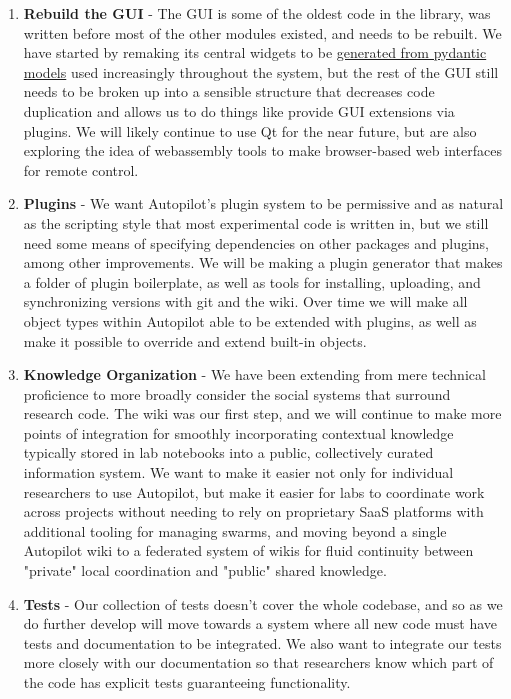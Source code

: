 \begin{enumerate}[ref=\thechapter.\arabic*]
    \item \label{future:gui} \textbf{Rebuild the GUI} - The GUI is some of the oldest code in the library, was written before most of the other modules existed, and needs to be rebuilt. We have started by remaking its central widgets to be \href{https://github.com/auto-pi-lot/autopilot/blob/f0d20fbf3b33f832cf31136ab7d16abe01a3e924/autopilot/gui/widgets/model.py}{generated from pydantic models} used increasingly throughout the system, but the rest of the GUI still needs to be broken up into a sensible structure that decreases code duplication and allows us to do things like provide GUI extensions via plugins. We will likely continue to use Qt for the near future, but are also exploring the idea of webassembly tools to make browser-based web interfaces for remote control.
    \item \label{future:plugins} \textbf{Plugins} - We want Autopilot's plugin system to be permissive and as natural as the scripting style that most experimental code is written in, but we still need some means of specifying dependencies on other packages and plugins, among other improvements. We will be making a plugin generator that makes a folder of plugin boilerplate, as well as tools for installing, uploading, and synchronizing versions with git and the wiki. Over time we will make all object types within Autopilot able to be extended with plugins, as well as make it possible to override and extend built-in objects.
    \item \label{future:knowledge} \textbf{Knowledge Organization} - We have been extending from mere technical proficience to more broadly consider the social systems that surround research code. The wiki was our first step, and we will continue to make more points of integration for smoothly incorporating contextual knowledge typically stored in lab notebooks into a public, collectively curated information system. We want to make it easier not only for individual researchers to use Autopilot, but make it easier for labs to coordinate work across projects without needing to rely on proprietary SaaS platforms with additional tooling for managing swarms, and moving beyond a single Autopilot wiki to a federated system of wikis for fluid continuity between "private" local coordination and "public" shared knowledge.
    \item \label{future:tests}\textbf{Tests} - Our collection of tests doesn't cover the whole codebase, and so as we do further develop will move towards a system where all new code must have tests and documentation to be integrated. We also want to integrate our tests more closely with our documentation so that researchers know which part of the code has explicit tests guaranteeing functionality.

\end{enumerate}
